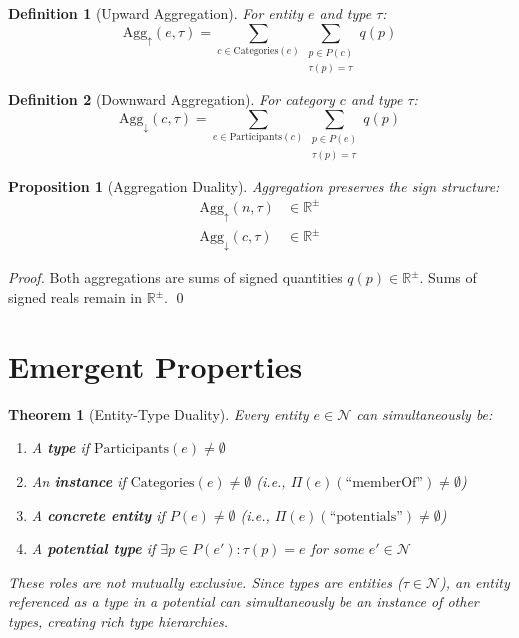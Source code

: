 \documentclass[11pt]{article}
\newtheorem{definition}{Definition}
\newtheorem{theorem}{Theorem}
\newtheorem{proposition}{Proposition}
\begin{document}
\begin{definition}[Upward Aggregation]
For entity $e$ and type $\tau$:
\[
\text{Agg}_\uparrow(e, \tau) = \sum_{c \in \text{Categories}(e)} \sum_{\substack{p \in P(c) \\ \tau(p) = \tau}} q(p)
\]
\end{definition}

\begin{definition}[Downward Aggregation]
For category $c$ and type $\tau$:
\[
\text{Agg}_\downarrow(c, \tau) = \sum_{e \in \text{Participants}(c)} \sum_{\substack{p \in P(e) \\ \tau(p) = \tau}} q(p)
\]
\end{definition}

\begin{proposition}[Aggregation Duality]
Aggregation preserves the sign structure:
\begin{align}
\text{Agg}_\uparrow(n, \tau) &\in \mathbb{R}^\pm \\
\text{Agg}_\downarrow(c, \tau) &\in \mathbb{R}^\pm
\end{align}
\end{proposition}

\begin{proof}
Both aggregations are sums of signed quantities $q(p) \in \mathbb{R}^\pm$. Sums of signed reals remain in $\mathbb{R}^\pm$. \qed
\end{proof}

\section{Emergent Properties}

\begin{theorem}[Entity-Type Duality]
Every entity $e \in \mathcal{N}$ can simultaneously be:
\begin{enumerate}
\item A \textbf{type} if $\text{Participants}(e) \neq \emptyset$
\item An \textbf{instance} if $\text{Categories}(e) \neq \emptyset$ (i.e., $\Pi(e)(\text{``memberOf''}) \neq \emptyset$)
\item A \textbf{concrete entity} if $P(e) \neq \emptyset$ (i.e., $\Pi(e)(\text{``potentials''}) \neq \emptyset$)
\item A \textbf{potential type} if $\exists p \in P(e'): \tau(p) = e$ for some $e' \in \mathcal{N}$
\end{enumerate}
These roles are not mutually exclusive. Since types are entities ($\tau \in \mathcal{N}$), an entity referenced as a type in a potential can simultaneously be an instance of other types, creating rich type hierarchies.
\end{theorem}
\end{document}
